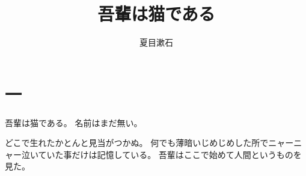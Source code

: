 \documentclass{jsarticle}
\title{吾輩は猫である}
\author{夏目漱石}
\begin{document}
\maketitle

\section*{一}

吾輩は猫である。
名前はまだ無い。

どこで生れたかとんと見当がつかぬ。
何でも薄暗いじめじめした所でニャーニャー泣いていた事だけは記憶している。
吾輩はここで始めて人間というものを見た。
\end{document}
